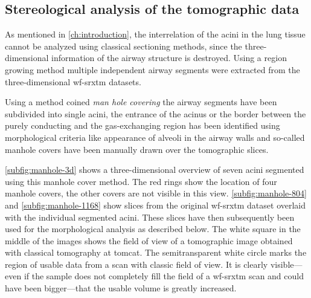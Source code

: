 \subsection{Stereological analysis of the tomographic data\label{subsec:stereological analysis}}
As mentioned in \autoref{ch:introduction}, the interrelation of the acini in the lung tissue cannot be analyzed using classical sectioning methods, since the three-dimensional information of the airway structure is destroyed. Using a region growing method multiple independent airway segments were extracted from the three-dimensional \ac{wf-srxtm} datasets.

Using a method coined \emph{man hole covering} the airway segments have been subdivided into single acini, \ie the entrance of the acinus or the border between the purely conducting and the gas-exchanging region has been identified using morphological criteria like appearance of alveoli in the airway walls and so-called manhole covers have been manually drawn over the tomographic slices. 

\autoref{subfig:manhole-3d} shows a three-dimensional overview of seven acini segmented using this manhole cover method. The red rings show the location of four manhole covers, the other covers are not visible in this view. \autoref{subfig:manhole-804} and \ref{subfig:manhole-1168} show slices from the original \ac{wf-srxtm} dataset overlaid with the individual segmented acini. These slices have then subsequently been used for the morphological analysis as described below. The white square in the middle of the images shows the field of view of a tomographic image obtained with classical tomography at \ac{tomcat}. The semitransparent white circle marks the region of usable data from a scan with classic field of view. It is clearly visible---even if the sample does not completely fill the field of a \ac{wf-srxtm} scan and could have been bigger---that the usable volume is greatly increased.

